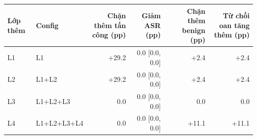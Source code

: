 \begin{tabular}{llrrrr}
\toprule
Lớp thêm & Config & Chặn thêm tấn công (pp) & Giảm ASR (pp) & Chặn thêm benign (pp) & Từ chối oan tăng thêm (pp) \\
\midrule
L1 & L1 & +29.2 & 0.0 [0.0, 0.0] & +2.4 & +2.4 \\
L2 & L1+L2 & +29.2 & 0.0 [0.0, 0.0] & +2.4 & +2.4 \\
L3 & L1+L2+L3 & 0.0 & 0.0 [0.0, 0.0] & 0.0 & 0.0 \\
L4 & L1+L2+L3+L4 & 0.0 & 0.0 [0.0, 0.0] & +11.1 & +11.1 \\
\bottomrule
\end{tabular}
